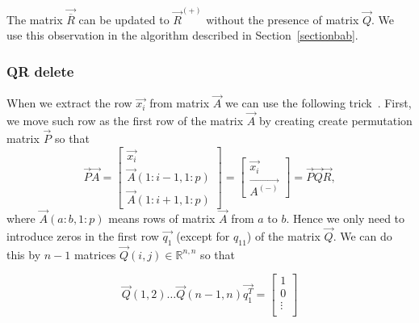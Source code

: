 \begin{note} \label{qnotrequired}
The matrix $\vec{\overline{R}}$  can be updated to $\vec{R}^{(+)}$  without the presence of matrix $\vec{Q}$. We use this observation  in the algorithm described in Section~\ref{sectionbab}.
\end{note}




\subsubsection*{QR delete}
When we extract the row $\vec{x_i}$ from matrix $\vec{A}$ we can use the following trick~\cite{hammarling2008updatingqr}. First, we move such row as the first row of the matrix $\vec{A}$ by creating create permutation matrix $\vec{P}$ so that 
\begin{equation}
    \vec{P}\vec{A} = \begin{bmatrix}
        \vec{x_i} \\
        \vec{A}(1:i-1 , 1:p) \\
        \vec{A}(1:i+1 , 1:p) 
    \end{bmatrix}
    = 
    \begin{bmatrix}
        \vec{x_i} \\
        \vec{A^{(-)}}
    \end{bmatrix}
    = \vec{P}\vec{Q}\vec{R},
\end{equation} 
where $\vec{A}(a:b , 1:p) $ means rows of matrix $\vec{A}$ from $a$ to $b$.
Hence we only need to introduce zeros in the first row $\vec{q_1}$ (except for $q_{11}$) of the matrix $\vec{Q}$. We can do this by $n-1$ matrices $\vec{Q}(i,j) \in \mathbb{R}^{n, n}$ so that

\begin{equation}
    \vec{Q}(1,2) \ldots \vec{Q}(n-1,n)\vec{q_1^T} =     \begin{bmatrix}
        1 \\
        0\\
        \vdots \\
    \end{bmatrix}
\end{equation}

